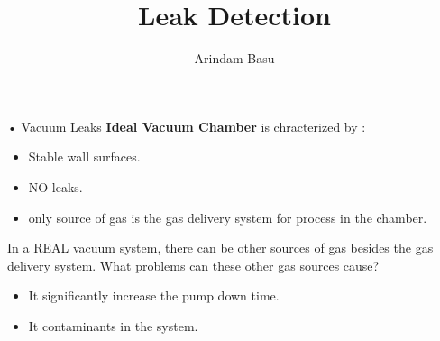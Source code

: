 \documentclass[11pt]{beamer}
\author{Arindam Basu}
\title{Leak Detection}
\begin{document}
\begin{frame}
\titlepage
\end{frame}



\begin{frame}
\end{frame}


\begin{frame}{• Vacuum Leaks}
\textbf{Ideal Vacuum Chamber } is chracterized by :\\
\begin{itemize}
\item Stable wall surfaces.
\item NO leaks.
\item only source of gas is the gas delivery system for process in the chamber.
\end{itemize}
In a REAL vacuum system, there can be other sources of gas besides the gas delivery system.
What problems can these other gas sources cause?
\begin{itemize}
\item It significantly increase the pump down time.
\item It contaminants in the system.
\end{itemize}



\end{frame}
\end{document}
